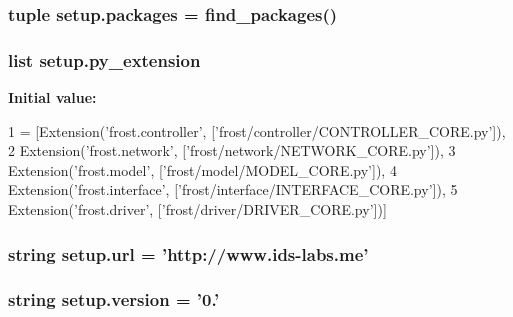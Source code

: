 \subsubsection[{packages}]{\setlength{\rightskip}{0pt plus 5cm}tuple setup.\+packages = find\+\_\+packages()}\label{namespacesetup_aac31bc6390743c46ed466881a9d62eb2}
\hypertarget{namespacesetup_a2816b61a4a960dcd212aa59a604e6179}{}
\subsubsection[{py\+\_\+extension}]{\setlength{\rightskip}{0pt plus 5cm}list setup.\+py\+\_\+extension}\label{namespacesetup_a2816b61a4a960dcd212aa59a604e6179}
{\bfseries Initial value\+:}
\begin{DoxyCode}
1 = [Extension(\textcolor{stringliteral}{'frost.controller'}, [\textcolor{stringliteral}{'frost/controller/CONTROLLER\_CORE.py'}]), 
2                           Extension(\textcolor{stringliteral}{'frost.network'}, [\textcolor{stringliteral}{'frost/network/NETWORK\_CORE.py'}]),
3                           Extension(\textcolor{stringliteral}{'frost.model'}, [\textcolor{stringliteral}{'frost/model/MODEL\_CORE.py'}]),
4                           Extension(\textcolor{stringliteral}{'frost.interface'}, [\textcolor{stringliteral}{'frost/interface/INTERFACE\_CORE.py'}]),
5                           Extension(\textcolor{stringliteral}{'frost.driver'}, [\textcolor{stringliteral}{'frost/driver/DRIVER\_CORE.py'}])]
\end{DoxyCode}
\hypertarget{namespacesetup_a3376e8b9735800b5b9e455914cee908d}{}
\subsubsection[{url}]{\setlength{\rightskip}{0pt plus 5cm}string setup.\+url = 'http\+://www.\+ids-\/labs.\+me'}\label{namespacesetup_a3376e8b9735800b5b9e455914cee908d}
\hypertarget{namespacesetup_ab177531e7a80674a3db3de2d79eb8be7}{}
\subsubsection[{version}]{\setlength{\rightskip}{0pt plus 5cm}string setup.\+version = '0.'}\label{namespacesetup_ab177531e7a80674a3db3de2d79eb8be7}
